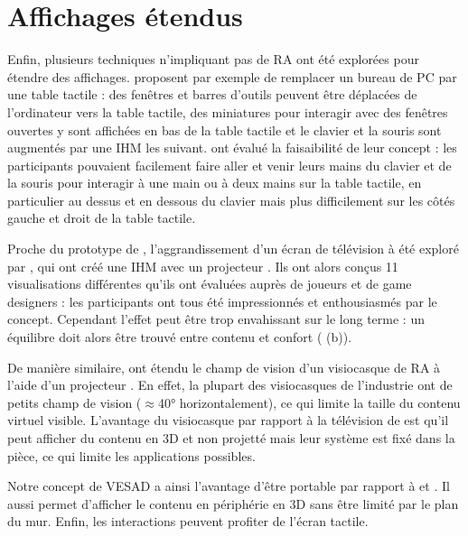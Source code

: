 \section{Affichages étendus}
\label{sec:litterature_extended_displays}

Enfin, plusieurs techniques n'impliquant pas de RA ont été explorées pour étendre des affichages. \cite{Bi2011} proposent par exemple de remplacer un bureau de PC par une table tactile  : des fenêtres et barres d'outils peuvent être déplacées de l'ordinateur vers la table tactile, des miniatures pour interagir avec des fenêtres ouvertes y sont affichées en bas de la table tactile et le clavier et la souris sont augmentés par une IHM les suivant. \citeauthor{Bi2011} ont évalué la faisaibilité de leur concept : les participants pouvaient facilement faire aller et venir leurs mains du clavier et de la souris pour interagir à une main ou à deux mains sur la table tactile, en particulier au dessus et en dessous du clavier mais plus difficilement sur les côtés gauche et droit de la table tactile.


Proche du prototype de \cite{Baudisch2002}, l'aggrandissement d'un écran de télévision à été exploré par \cite{Jones2013}, qui ont créé une IHM  avec un projecteur . Ils ont alors conçus 11 visualisations différentes qu'ils ont évaluées auprès de joueurs et de game designers : les participants ont tous été impressionnés et enthousiasmés par le concept. Cependant l'effet peut être trop envahissant sur le long terme : un équilibre doit alors être trouvé entre contenu et confort ( (b)). 

De manière similaire, \cite{Benko2015} ont étendu le champ de vision d'un visiocasque de RA à l'aide d'un projecteur . En effet, la plupart des visiocasques de l'industrie ont de petits champ de vision ($\approx$\ang{40} horizontalement), ce qui limite la taille du contenu virtuel visible. L'avantage du visiocasque par rapport à la télévision de \cite{Jones2013} est qu'il peut afficher du contenu en 3D et non projetté mais leur système est fixé dans la pièce, ce qui limite les applications possibles.

Notre concept de VESAD a ainsi l'avantage d'être portable par rapport à \cite{Jones2013} et \cite{Benko2015}. Il aussi permet d'afficher le contenu en périphérie en 3D sans être limité par le plan du mur. Enfin, les interactions peuvent profiter de l'écran tactile.


